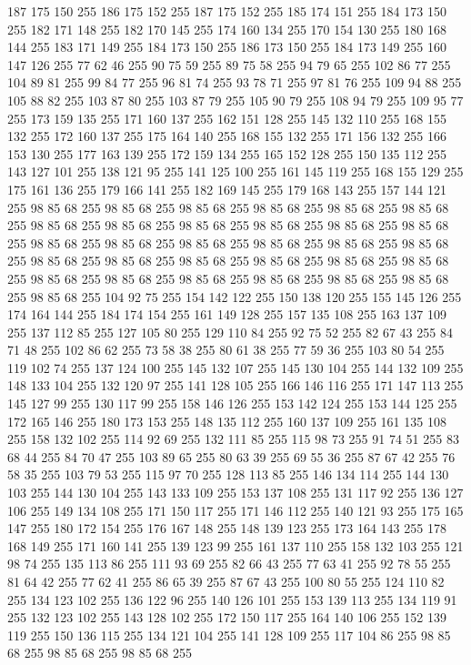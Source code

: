 187 175 150 255 186 175 152 255 187 175 152 255 185 174 151 255 184 173 150 255 182 171 148 255 182 170 145 255 174 160 134 255 170 154 130 255 180 168 144 255 183 171 149 255 184 173 150 255 186 173 150 255 184 173 149 255 160 147 126 255 77 62 46 255 90 75 59 255 89 75 58 255 94 79 65 255 102 86 77 255 104 89 81 255 99 84 77 255 96 81 74 255 93 78 71 255 97 81 76 255 109 94 88 255 105 88 82 255 103 87 80 255 103 87 79 255 105 90 79 255 108 94 79 255 109 95 77 255 173 159 135 255 171 160 137 255 162 151 128 255 145 132 110 255 168 155 132 255 172 160 137 255 175 164 140 255 168 155 132 255 171 156 132 255 166 153 130 255 177 163 139 255 172 159 134 255 165 152 128 255 150 135 112 255 143 127 101 255 138 121 95 255 141 125 100 255 161 145 119 255 168 155 129 255 175 161 136 255 179 166 141 255 182 169 145 255 179 168 143 255 157 144 121 255 98 85 68 255 98 85 68 255 98 85 68 255 98 85 68 255 98 85 68 255 98 85 68 255 98 85 68 255 98 85 68 255
98 85 68 255 98 85 68 255 98 85 68 255 98 85 68 255 98 85 68 255 98 85 68 255 98 85 68 255 98 85 68 255 98 85 68 255 98 85 68 255 98 85 68 255 98 85 68 255 98 85 68 255 98 85 68 255 98 85 68 255 98 85 68 255 98 85 68 255 98 85 68 255 98 85 68 255 98 85 68 255 98 85 68 255 98 85 68 255 98 85 68 255 104 92 75 255 154 142 122 255 150 138 120 255 155 145 126 255 174 164 144 255 184 174 154 255 161 149 128 255 157 135 108 255 163 137 109 255 137 112 85 255 127 105 80 255 129 110 84 255 92 75 52 255 82 67 43 255 84 71 48 255 102 86 62 255 73 58 38 255 80 61 38 255 77 59 36 255 103 80 54 255 119 102 74 255 137 124 100 255 145 132 107 255 145 130 104 255 144 132 109 255 148 133 104 255 132 120 97 255 141 128 105 255 166 146 116 255 171 147 113 255 145 127 99 255 130 117 99 255 158 146 126 255 153 142 124 255 153 144 125 255 172 165 146 255 180 173 153 255 148 135 112 255 160 137 109 255 161 135 108 255 158 132 102 255
114 92 69 255 132 111 85 255 115 98 73 255 91 74 51 255 83 68 44 255 84 70 47 255 103 89 65 255 80 63 39 255 69 55 36 255 87 67 42 255 76 58 35 255 103 79 53 255 115 97 70 255 128 113 85 255 146 134 114 255 144 130 103 255 144 130 104 255 143 133 109 255 153 137 108 255 131 117 92 255 136 127 106 255 149 134 108 255 171 150 117 255 171 146 112 255 140 121 93 255 175 165 147 255 180 172 154 255 176 167 148 255 148 139 123 255 173 164 143 255 178 168 149 255 171 160 141 255 139 123 99 255 161 137 110 255 158 132 103 255 121 98 74 255 135 113 86 255 111 93 69 255 82 66 43 255 77 63 41 255 92 78 55 255 81 64 42 255 77 62 41 255 86 65 39 255 87 67 43 255 100 80 55 255 124 110 82 255 134 123 102 255 136 122 96 255 140 126 101 255 153 139 113 255 134 119 91 255 132 123 102 255 143 128 102 255 172 150 117 255 164 140 106 255 152 139 119 255 150 136 115 255 134 121 104 255 141 128 109 255 117 104 86 255 98 85 68 255 98 85 68 255 98 85 68 255
